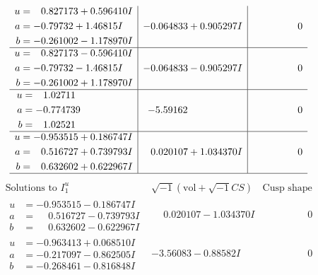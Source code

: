 \documentclass[1p]{elsarticle_modified}
\theoremstyle{definition}
\newcommand{\I}{\sqrt{-1}}
\begin{document}
$$\begin{array}{c|c|c}
\begin{aligned}
u &= \phantom{-}0.827173 + 0.596410 I \\
a &= -0.79732 + 1.46815 I \\
b &= -0.261002 - 1.178970 I\end{aligned}
 & -0.064833 + 0.905297 I & \phantom{-0.000000 } 0 \\ \hline\begin{aligned}
u &= \phantom{-}0.827173 - 0.596410 I \\
a &= -0.79732 - 1.46815 I \\
b &= -0.261002 + 1.178970 I\end{aligned}
 & -0.064833 - 0.905297 I & \phantom{-0.000000 } 0 \\ \hline\begin{aligned}
u &= \phantom{-}1.02711\phantom{ +0.000000I} \\
a &= -0.774739\phantom{ +0.000000I} \\
b &= \phantom{-}1.02521\phantom{ +0.000000I}\end{aligned}
 & -5.59162\phantom{ +0.000000I} & \phantom{-0.000000 } 0 \\ \hline\begin{aligned}
u &= -0.953515 + 0.186747 I \\
a &= \phantom{-}0.516727 + 0.739793 I \\
b &= \phantom{-}0.632602 + 0.622967 I\end{aligned}
 & \phantom{-}0.020107 + 1.034370 I & \phantom{-0.000000 } 0\\
 \hline 
 \end{array}$$\newpage$$\begin{array}{c|c|c}  
\text{Solutions to }I^u_{1}& \I (\text{vol} + \sqrt{-1}CS) & \text{Cusp shape}\\
 \hline 
\begin{aligned}
u &= -0.953515 - 0.186747 I \\
a &= \phantom{-}0.516727 - 0.739793 I \\
b &= \phantom{-}0.632602 - 0.622967 I\end{aligned}
 & \phantom{-}0.020107 - 1.034370 I & \phantom{-0.000000 } 0 \\ \hline\begin{aligned}
u &= -0.963413 + 0.068510 I \\
a &= -0.217097 - 0.862505 I \\
b &= -0.268461 - 0.816848 I\end{aligned}
 & -3.56083 - 0.88582 I & \phantom{-0.000000 } 0 \\ \hline\begin{aligned}

\end{aligned}
\end{array}$$
\end{document}
